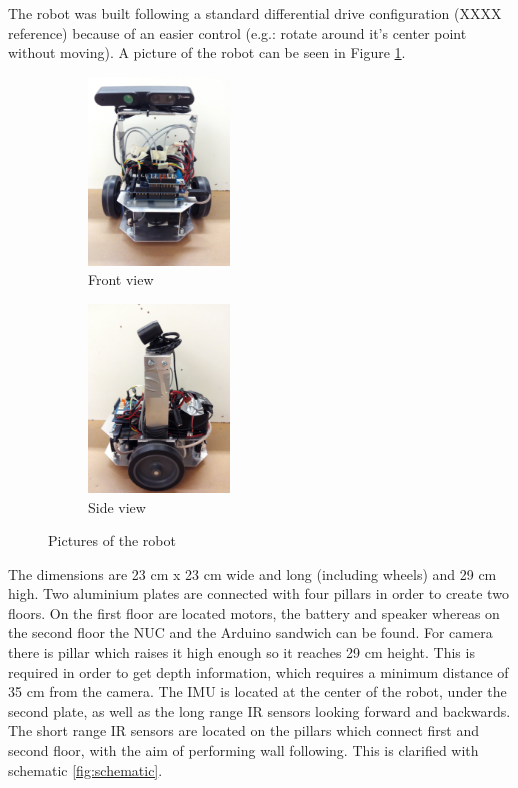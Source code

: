 The robot was built following a standard differential drive configuration (XXXX reference) because of an easier control (e.g.: rotate around it's center point without moving). A picture of the robot can be seen in Figure \ref{fig:robotPic}.

\begin{figure}[h]
        \centering
        \begin{subfigure}[b]{0.45\linewidth}
        \centering
                \includegraphics[height=5cm]{figures/front.jpg}
		\caption{Front view}
        \end{subfigure}
        \begin{subfigure}[b]{0.45\linewidth}
        \centering
                \includegraphics[height=5cm]{figures/side.jpg}
                \caption{Side view}
        \end{subfigure}
        \caption{Pictures of the robot}
                \label{fig:robotPic}
\end{figure}


The dimensions are 23 cm x 23 cm wide and long (including wheels) and 29 cm high. Two aluminium plates are connected with four pillars in order to create two floors. On the first floor are located motors, the battery and speaker whereas on the second floor the NUC and the Arduino sandwich can be found. For camera there is pillar which raises it high enough so it reaches 29 cm height. This is required in order to get depth information, which requires a minimum distance of 35 cm from the camera. The IMU is located at the center of the robot, under the second plate, as well as the long range IR sensors looking forward and backwards. The short range IR sensors are located on the pillars which connect first and second floor, with the aim of performing wall following. This is clarified with schematic \ref{fig:schematic}.